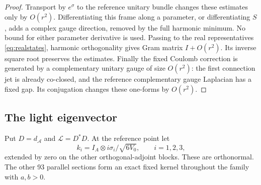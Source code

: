 \begin{proof}
Transport by $e^\sigma$ to the reference unitary bundle changes these
estimates only by $O(r^2)$. Differentiating this frame along a parameter,
or differentiating $S$, adds a complex gauge direction, removed by the
full harmonic minimum. No bound for either parameter derivative is used.
Passing to the real representatives \eqref{eq:realstates}, harmonic
orthogonality gives Gram matrix $I+O(r^2)$. Its inverse square root
preserves the estimates. Finally the fixed Coulomb correction is generated
by a complementary unitary gauge of size $O(r^2)$: the first connection
jet is already co-closed, and the reference complementary gauge Laplacian
has a fixed gap. Its conjugation changes these one-forms by $O(r^2)$.
\end{proof}

\subsection{The light eigenvector}
Put $D=d_{\mathcal A}$ and $\mathcal L=D^*D$. At the reference point let
\begin{equation}\label{eq:pauliprofiles}
 k_i=I_A\otimes i\sigma_i/\sqrt{6V_0},\qquad i=1,2,3,
\end{equation}
extended by zero on the other orthogonal-adjoint blocks. These are
orthonormal. The other 93 parallel sections form an exact fixed kernel
throughout the family with $a,b>0$.

